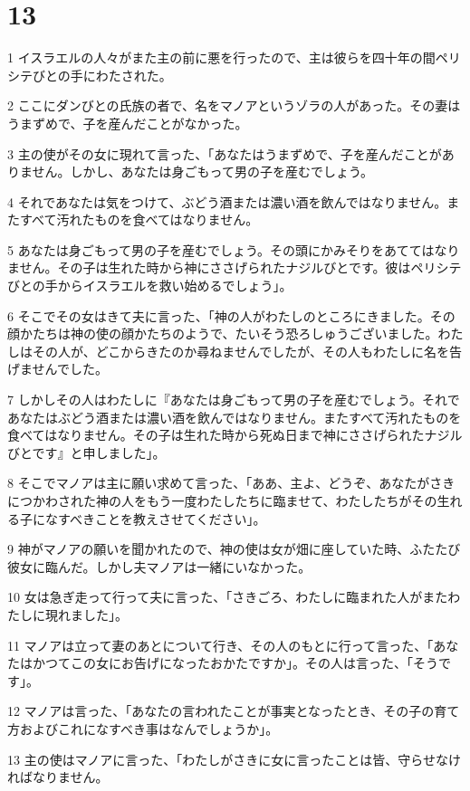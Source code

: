 \chapter{13}

\par 1 イスラエルの人々がまた主の前に悪を行ったので、主は彼らを四十年の間ペリシテびとの手にわたされた。
\par 2 ここにダンびとの氏族の者で、名をマノアというゾラの人があった。その妻はうまずめで、子を産んだことがなかった。
\par 3 主の使がその女に現れて言った、「あなたはうまずめで、子を産んだことがありません。しかし、あなたは身ごもって男の子を産むでしょう。
\par 4 それであなたは気をつけて、ぶどう酒または濃い酒を飲んではなりません。またすべて汚れたものを食べてはなりません。
\par 5 あなたは身ごもって男の子を産むでしょう。その頭にかみそりをあててはなりません。その子は生れた時から神にささげられたナジルびとです。彼はペリシテびとの手からイスラエルを救い始めるでしょう」。
\par 6 そこでその女はきて夫に言った、「神の人がわたしのところにきました。その顔かたちは神の使の顔かたちのようで、たいそう恐ろしゅうございました。わたしはその人が、どこからきたのか尋ねませんでしたが、その人もわたしに名を告げませんでした。
\par 7 しかしその人はわたしに『あなたは身ごもって男の子を産むでしょう。それであなたはぶどう酒または濃い酒を飲んではなりません。またすべて汚れたものを食べてはなりません。その子は生れた時から死ぬ日まで神にささげられたナジルびとです』と申しました」。
\par 8 そこでマノアは主に願い求めて言った、「ああ、主よ、どうぞ、あなたがさきにつかわされた神の人をもう一度わたしたちに臨ませて、わたしたちがその生れる子になすべきことを教えさせてください」。
\par 9 神がマノアの願いを聞かれたので、神の使は女が畑に座していた時、ふたたび彼女に臨んだ。しかし夫マノアは一緒にいなかった。
\par 10 女は急ぎ走って行って夫に言った、「さきごろ、わたしに臨まれた人がまたわたしに現れました」。
\par 11 マノアは立って妻のあとについて行き、その人のもとに行って言った、「あなたはかつてこの女にお告げになったおかたですか」。その人は言った、「そうです」。
\par 12 マノアは言った、「あなたの言われたことが事実となったとき、その子の育て方およびこれになすべき事はなんでしょうか」。
\par 13 主の使はマノアに言った、「わたしがさきに女に言ったことは皆、守らせなければなりません。
